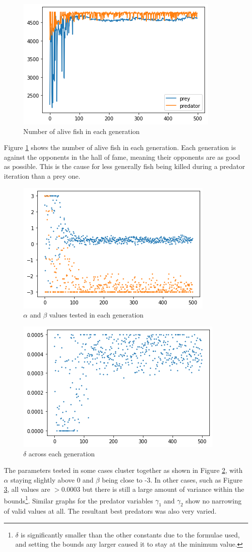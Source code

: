 
\begin{figure}
    \centering
    \includegraphics[width=0.5\linewidth]{fig/alive_2_v1.png}
    \caption{Number of alive fish in each generation}
    \label{fig:alive_II_1}
\end{figure}
Figure \ref{fig:alive_II_1} shows the number of alive fish in each generation. Each generation is against the opponents in the hall of fame, meaning their opponents are as good as possible. This is the cause for less generally fish being killed during a predator iteration than a prey one.
\begin{figure}
    \centering
    \includegraphics[width=0.5\linewidth]{fig/2-alpha-beta-1.png}
    \caption{$\alpha$ and $\beta$ values tested in each generation}
    \label{fig:a_b_2}
\end{figure}
\begin{figure}
    \centering
    \includegraphics[width=0.5\linewidth]{fig/g_b_2.png}
    \caption{$\delta$ across each generation}
    \label{fig:d_2}
\end{figure}
The parameters tested in some cases cluster together as shown in Figure \ref{fig:a_b_2}, with $\alpha$ staying slightly above 0 and $\beta$ being close to -3. In other cases, such as Figure \ref{fig:d_2}, all values are $>0.0003$ but there is still a large amount of variance within the bounds\footnote{$\delta$ is significantly smaller than the other constants due to the formulae used, and setting the bounds any larger caused it to stay at the minimum value.}. Similar graphs for the predator variables $\gamma_1$ and $\gamma_2$ show no narrowing of valid values at all. The resultant best predators was also very varied.\par
